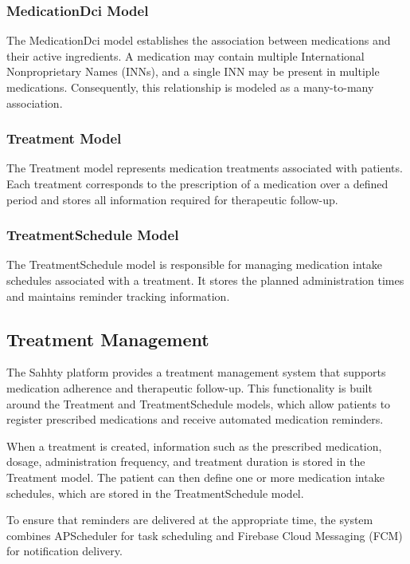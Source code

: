 \subsubsection{MedicationDci Model}

The MedicationDci model establishes the association between medications and their active ingredients. A medication may contain multiple International Nonproprietary Names (INNs), and a single INN may be present in multiple medications. Consequently, this relationship is modeled as a many-to-many association.
\subsubsection{Treatment Model}

The Treatment model represents medication treatments associated with patients. Each treatment corresponds to the prescription of a medication over a defined period and stores all information required for therapeutic follow-up.

\subsubsection{TreatmentSchedule Model}

The TreatmentSchedule model is responsible for managing medication intake schedules associated with a treatment. It stores the planned administration times and maintains reminder tracking information.

\subsection{Treatment Management}
\label{subsec:treatment_management}

The Sahhty platform provides a treatment management system that supports medication adherence and therapeutic follow-up. This functionality is built around the Treatment and TreatmentSchedule models, which allow patients to register prescribed medications and receive automated medication reminders.

When a treatment is created, information such as the prescribed medication, dosage, administration frequency, and treatment duration is stored in the Treatment model. The patient can then define one or more medication intake schedules, which are stored in the TreatmentSchedule model.

To ensure that reminders are delivered at the appropriate time, the system combines APScheduler for task scheduling and Firebase Cloud Messaging (FCM) for notification delivery.

